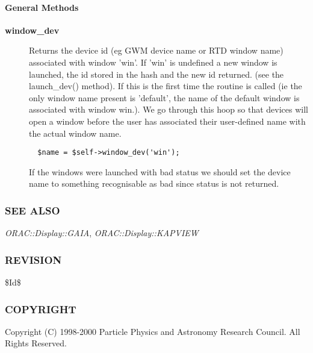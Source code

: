 \paragraph*{General Methods\label{ORAC::Display::Base_General_Methods}}
\begin{description}

\item[{\textbf{window\_dev}}] \mbox{}

Returns the device id (eg GWM device name or RTD window name)
associated with window 'win'. If 'win' is undefined a new
window is launched, the id stored in the hash and the
new id returned. (see the launch\_dev() method). If this
is the first time the routine is called (ie the only window
name present is 'default', the name of the default window
is associated with window win.). We go through this hoop
so that devices will open a window before the user has associated
their user-defined name with the actual window name.

\begin{verbatim}
  $name = $self->window_dev('win');
\end{verbatim}


If the windows were launched with bad status we should
set the device name to something recognisable as bad
since status is not returned.

\end{description}
\subsubsection*{SEE ALSO\label{ORAC::Display::Base_SEE_ALSO}}


\emph{ORAC::Display::GAIA}, \emph{ORAC::Display::KAPVIEW}

\subsubsection*{REVISION\label{ORAC::Display::Base_REVISION}}


\$Id\$

\subsubsection*{COPYRIGHT\label{ORAC::Display::Base_COPYRIGHT}}


Copyright (C) 1998-2000 Particle Physics and Astronomy Research
Council. All Rights Reserved.

